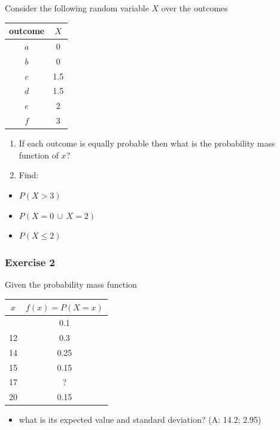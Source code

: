 \documentclass[
]{book}
\providecommand{\tightlist}{%
  \setlength{\itemsep}{0pt}\setlength{\parskip}{0pt}}
\begin{document}
Consider the following random variable \(X\) over the outcomes

\begin{longtable}[]{@{}cc@{}}
\toprule\noalign{}
outcome & \(X\) \\
\midrule\noalign{}
\endhead
\bottomrule\noalign{}
\endlastfoot
\(a\) & 0 \\
\(b\) & 0 \\
\(c\) & 1.5 \\
\(d\) & 1.5 \\
\(e\) & 2 \\
\(f\) & 3 \\
\end{longtable}

\begin{enumerate}
\def\labelenumi{\alph{enumi})}
\item
  If each outcome is equally probable then what is the probability mass function of \(x\)?
\item
  Find:
\end{enumerate}

\begin{itemize}
\tightlist
\item
  \(P(X>3)\)
\item
  \(P(X=0\, \cup \, X=2 )\)
\item
  \(P(X \leq 2)\)
\end{itemize}

\hypertarget{exercise-2-2}{%
\subsubsection{Exercise 2}\label{exercise-2-2}}

Given the probability mass function

\begin{longtable}[]{@{}cc@{}}
\toprule\noalign{}
\(x\) & \(f(x)=P(X=x)\) \\
\midrule\noalign{}
\endhead
\bottomrule\noalign{}
\endlastfoot
10 & 0.1 \\
12 & 0.3 \\
14 & 0.25 \\
15 & 0.15 \\
17 & ? \\
20 & 0.15 \\
\end{longtable}

\begin{itemize}
\tightlist
\item
  what is its expected value and standard deviation? (A: 14.2; 2.95)
\end{itemize}
\end{document}
